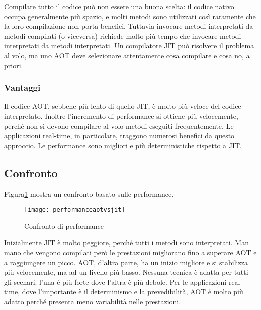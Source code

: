 Compilare tutto il codice può non essere una buona scelta: il codice nativo occupa generalmente più spazio, e molti metodi sono utilizzati così raramente che la loro compilazione non porta benefici. Tuttavia invocare metodi interpretati da metodi compilati (o viceversa) richiede molto più tempo che invocare metodi interpretati da metodi interpretati. Un compilatore JIT può risolvere il problema al volo, ma uno AOT deve selezionare attentamente cosa compilare e cosa no, a priori. 

\subsubsection{Vantaggi}
Il codice AOT, sebbene più lento di quello JIT, è molto più veloce del codice interpretato. Inoltre l'incremento di performance si ottiene più velocemente, perché non si devono compilare al volo metodi eseguiti frequentemente. Le applicazioni real-time, in particolare, traggono numerosi benefici da questo approccio. Le performance sono migliori e più deterministiche rispetto a JIT. 

\subsection{Confronto}
Figura\ref{fig:performanceaotvsjit} mostra un confronto basato sulle performance. 
\begin{figure}[h]
	\centering
	\texttt{[image: performanceaotvsjit]}
	\caption[Confronto di performance]{Confronto di performance}
	\label{fig:performanceaotvsjit}
\end{figure}

Inizialmente JIT è molto peggiore, perché tutti i metodi sono interpretati. Man mano che vengono compilati però le prestazioni migliorano fino a superare AOT e a raggiungere un picco. AOT, d'altra parte, ha un inizio migliore e si stabilizza più velocemente, ma ad un livello più basso. Nessuna tecnica è adatta per tutti gli scenari: l'una è più forte dove l'altra è più debole. Per le applicazioni real-time, dove l'importante è il determinismo e la prevedibilità, AOT è molto più adatto perché presenta meno variabilità nelle prestazioni.